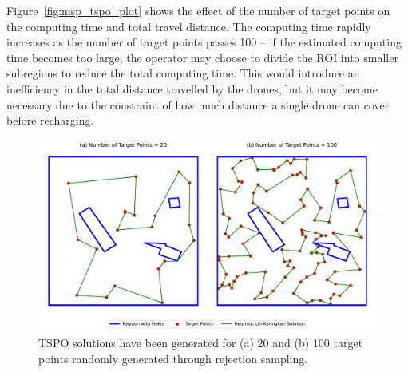 Figure~\ref{fig:msp_tspo_plot} shows the effect of the number of target points on the computing time and total travel distance. The computing time rapidly increases as the number of target points passes 100 -- if the estimated computing time becomes too large, the operator may choose to divide the \gls{ROI} into smaller subregions to reduce the total computing time. This would introduce an inefficiency in the total distance travelled by the drones, but it may become necessary due to the constraint of how much distance a single drone can cover before recharging. 


\begin{figure}[h!]
    \centering
    \includegraphics[width=\linewidth]{figs/Jihwan/TSPO_diff_targets.pdf}
    \caption[TSP-O Solution for Different Numbers of Target Points]
    {\gls{TSPO} solutions have been generated for (a) 20 and (b) 100 target points randomly generated through rejection sampling.}
    \label{fig:msp_tspo_20_100}
\end{figure}

